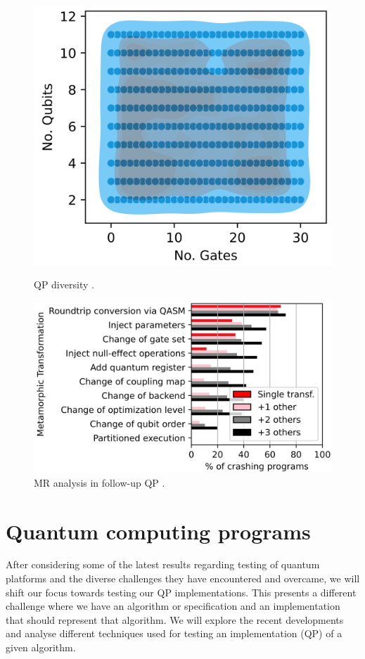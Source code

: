 \begin{itemize}
\begin{figure}[!tbp]
  \centering
  \begin{minipage}[b]{0.36\textwidth}
    \includegraphics[width=\textwidth]{TFM/photos/MorpgQDiverQP.png}
    \caption{QP diversity \cite{paltenghi2023morphq}.} 
    \label{Fig:MorpgQDiverQP}
  \end{minipage}
  \hfill
  \begin{minipage}[b]{0.55\textwidth}
    \includegraphics[width=\textwidth]{TFM/photos/MorphQMRCrash.png}
    \caption{MR analysis in follow-up QP \cite{paltenghi2023morphq}.} 
    \label{Fig:MorphQMRCrash}
  \end{minipage}
\end{figure}

\section{Quantum computing programs}
\label{Ch3.2:TQP}
After considering some of the latest results regarding testing of quantum platforms and the diverse challenges they have encountered and overcame, we will shift our focus towards testing our QP implementations. This presents a different challenge where we have an algorithm or specification and an implementation that should represent that algorithm. We will explore the recent developments and analyse different techniques used for testing an implementation (QP) of a given algorithm.


\end{itemize}
